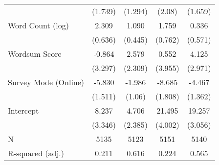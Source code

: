\begin{table}[h]
\begin{tabular}{lcccc}
   & (1.739) & (1.294) & (2.08) & (1.659) \\ 
  Word Count (log) &   2.309 &   1.090 &   1.759 &   0.336 \\ 
   & (0.636) & (0.445) & (0.762) & (0.571) \\ 
  Wordsum Score &  -0.864 &   2.579 &   0.552 &   4.125 \\ 
   & (3.297) & (2.309) & (3.955) & (2.971) \\ 
  Survey Mode (Online) &  -5.830 &  -1.986 &  -8.685 &  -4.467 \\ 
   & (1.511) & (1.06) & (1.808) & (1.362) \\ 
  Intercept &   8.237 &   4.706 &  21.495 &  19.257 \\ 
   & (3.346) & (2.385) & (4.002) & (3.056) \\ 
   \hline
N & 5135 & 5123 & 5151 & 5140 \\ 
  R-squared (adj.) & 0.211 & 0.616 & 0.224 & 0.565 \\ 
   \hline
\end{tabular}
\endgroup
\end{table}

